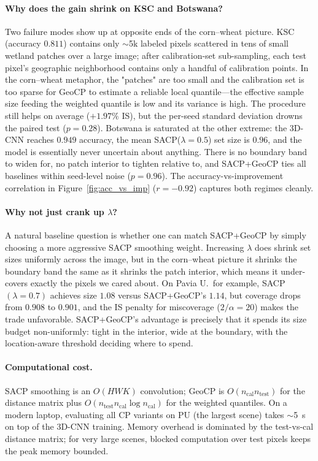 \documentclass[11pt]{article}
\newcommand{\1}{\mathbf{1}}
\begin{document}
\paragraph{Why does the gain shrink on KSC and Botswana?}  Two failure modes show up at opposite ends of the corn--wheat picture. KSC (accuracy $0.811$) contains only $\sim$5k labeled pixels scattered in tens of small wetland patches over a large image; after calibration-set sub-sampling, each test pixel's geographic neighborhood contains only a handful of calibration points. In the corn--wheat metaphor, the "patches" are too small and the calibration set is too sparse for GeoCP to estimate a reliable local quantile---the effective sample size feeding the weighted quantile is low and its variance is high. The procedure still helps on average ($+1.97\%$ IS), but the per-seed standard deviation drowns the paired test ($p = 0.28$). Botswana is saturated at the other extreme: the 3D-CNN reaches $0.949$ accuracy, the mean SACP($\lambda{=}0.5$) set size is $0.96$, and the model is essentially never uncertain about anything. There is no boundary band to widen for, no patch interior to tighten relative to, and SACP+GeoCP ties all baselines within seed-level noise ($p = 0.96$). The accuracy-vs-improvement correlation in Figure~\ref{fig:acc_vs_imp} ($r = -0.92$) captures both regimes cleanly.

\paragraph{Why not just crank up $\lambda$?}  A natural baseline question is whether one can match SACP+GeoCP by simply choosing a more aggressive SACP smoothing weight. Increasing $\lambda$ does shrink set sizes uniformly across the image, but in the corn--wheat picture it shrinks the boundary band the same as it shrinks the patch interior, which means it under-covers exactly the pixels we cared about. On Pavia U.\ for example, SACP$(\lambda{=}0.7)$ achieves size $1.08$ versus SACP+GeoCP's $1.14$, but coverage drops from $0.908$ to $0.901$, and the IS penalty for miscoverage ($2/\alpha = 20$) makes the trade unfavorable. SACP+GeoCP's advantage is precisely that it spends its size budget non-uniformly: tight in the interior, wide at the boundary, with the location-aware threshold deciding where to spend.

\paragraph{Computational cost.} SACP smoothing is an $O(HW K)$ convolution; GeoCP is $O(n_{\text{cal}} n_{\text{test}})$ for the distance matrix plus $O(n_{\text{test}} n_{\text{cal}} \log n_{\text{cal}})$ for the weighted quantiles. On a modern laptop, evaluating all CP variants on PU (the largest scene) takes $\sim$5~s on top of the 3D-CNN training. Memory overhead is dominated by the test-vs-cal distance matrix; for very large scenes, blocked computation over test pixels keeps the peak memory bounded.
\end{document}
